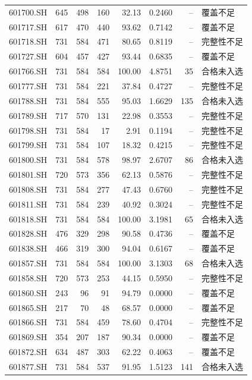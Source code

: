 \documentclass[10pt,a4paper]{article}
\begin{document}
\begin{longtable}{lrrr r r r l}
601700.SH & 645 & 498 & 160 & 32.13 & 0.2460 & -- & 覆盖不足\\
601717.SH & 617 & 470 & 440 & 93.62 & 0.7142 & -- & 覆盖不足\\
601718.SH & 731 & 584 & 471 & 80.65 & 0.8119 & -- & 完整性不足\\
601727.SH & 604 & 457 & 427 & 93.44 & 0.6835 & -- & 覆盖不足\\
601766.SH & 731 & 584 & 584 & 100.00 & 4.8751 & 35 & 合格未入选\\
601777.SH & 731 & 584 & 221 & 37.84 & 0.4727 & -- & 完整性不足\\
601788.SH & 731 & 584 & 555 & 95.03 & 1.6629 & 135 & 合格未入选\\
601789.SH & 717 & 570 & 131 & 22.98 & 0.3553 & -- & 完整性不足\\
601798.SH & 731 & 584 & 17 & 2.91 & 0.1194 & -- & 完整性不足\\
601799.SH & 731 & 584 & 107 & 18.32 & 0.4215 & -- & 完整性不足\\
601800.SH & 731 & 584 & 578 & 98.97 & 2.6707 & 86 & 合格未入选\\
601801.SH & 720 & 573 & 356 & 62.13 & 0.5876 & -- & 完整性不足\\
601808.SH & 731 & 584 & 277 & 47.43 & 0.6760 & -- & 完整性不足\\
601811.SH & 731 & 584 & 239 & 40.92 & 0.3024 & -- & 完整性不足\\
601818.SH & 731 & 584 & 584 & 100.00 & 3.1981 & 65 & 合格未入选\\
601828.SH & 476 & 329 & 298 & 90.58 & 0.4736 & -- & 覆盖不足\\
601838.SH & 466 & 319 & 300 & 94.04 & 0.6167 & -- & 覆盖不足\\
601857.SH & 731 & 584 & 584 & 100.00 & 3.1303 & 68 & 合格未入选\\
601858.SH & 720 & 573 & 253 & 44.15 & 0.5950 & -- & 完整性不足\\
601860.SH & 243 & 96 & 91 & 94.79 & 0.0000 & -- & 覆盖不足\\
601865.SH & 217 & 70 & 48 & 68.57 & 0.0000 & -- & 覆盖不足\\
601866.SH & 731 & 584 & 459 & 78.60 & 0.4704 & -- & 完整性不足\\
601869.SH & 354 & 207 & 187 & 90.34 & 0.0000 & -- & 覆盖不足\\
601872.SH & 634 & 487 & 303 & 62.22 & 0.4063 & -- & 覆盖不足\\
601877.SH & 731 & 584 & 537 & 91.95 & 1.5123 & 141 & 合格未入选\\

\end{longtable}
\end{document}
